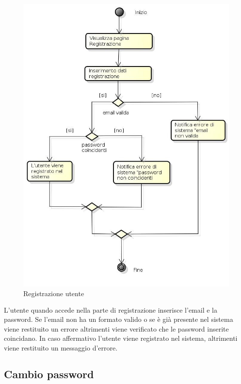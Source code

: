 \begin{figure}[h!]
		\centering
		\includegraphics[scale=.2]{img/Registrazione.jpg}
		\caption{Registrazione utente}
		\label{fig:ModelloSpy}
\end{figure}

L'utente quando accede nella parte di registrazione inserisce l'email e la password. Se l'email non ha un formato valido o se è già presente nel sistema viene restituito un errore altrimenti viene verificato che le password inserite coincidano. In caso affermativo l'utente viene registrato nel sistema, altrimenti viene restituito un messaggio d'errore.

\subsection{Cambio password}

